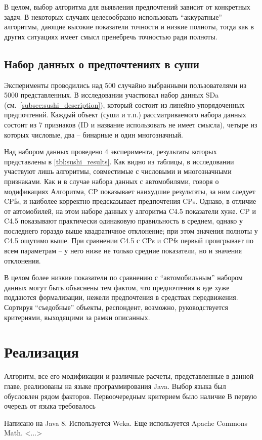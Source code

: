 	В целом, выбор алгоритма для выявления предпочтений зависит от конкретных задач. В некоторых случаях целесообразно использовать ``аккуратные'' алгоритмы, дающие высокие показатели точности и низкие полноты, тогда как в других ситуациях имеет смысл пренебречь точностью ради полноты.  
	
	
	\subsection{Набор данных о предпочтениях в суши} 
	\label{subsec:exp_sushi}
		Эксперименты проводились над 500 случайно выбранными пользователями из 5000 представленных. В исследовании участвовал набор данных SDa (см.~\ref{subsec:sushi_description}), который состоит из линейно упорядоченных предпочтений. Каждый объект (суши и т.п.) рассматриваемого набора данных состоит из 7 признаков (ID и название использовать не имеет смысла), четыре из которых числовые, два – бинарные и один многозначный.
	
		Над набором данных проведено 4 эксперимента, результаты которых представлены в \ref{tbl:sushi_results}. Как видно из таблицы, в исследовании участвуют лишь алгоритмы, совместимые с числовыми и многозначными признаками. Как и в случае набора данных с автомобилями, говоря о модификациях Алгоритма, CP показывает наихудшие результаты, за ним следует CPfs, и наиболее корректно предсказывает предпочтения CPs. Однако, в отличие от автомобилей, на этом наборе данных у алгоритма C4.5 показатели хуже. CP и C4.5 показывают практически одинаковую правильность в среднем, однако у последнего гораздо выше квадратичное отклонение; при этом значения полноты у C4.5 ощутимо выше. При сравнении C4.5 с CPs и CPfs первый проигрывает по всем параметрам – у него ниже не только средние показатели, но и значения отклонения.
		
		В целом более низкие показатели по сравнению с ``автомобильным'' набором данных могут быть объяснены тем фактом, что предпочтения в еде хуже поддаются формализации, нежели предпочтения в средствах передвижения. Сортируя ``съедобные'' объекты, респондент, возможно, руководствуется критериями, выходящими за рамки описанных.

\section{Реализация}
	Алгоритм, все его модификации и различные расчеты, представленные в данной главе, реализованы на языке программирования Java. Выбор языка был обусловлен рядом факторов. Первоочередным критерием было наличие  В первую очередь от языка требовалось 

	Написано на Java 8. Используется Weka. Еще используется Apache Commons Math.
	<...>
